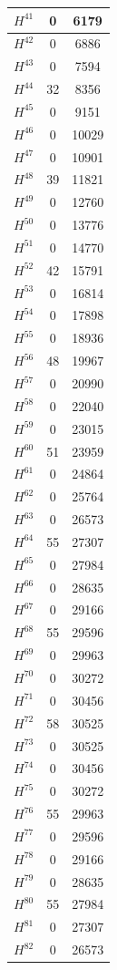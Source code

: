 \begin{tabular}{|c|c|c|}
\hline
$H^{41}$&0&6179\\\hline
$H^{42}$&0&6886\\\hline
$H^{43}$&0&7594\\\hline
$H^{44}$&32&8356\\\hline
$H^{45}$&0&9151\\\hline
$H^{46}$&0&10029\\\hline
$H^{47}$&0&10901\\\hline
$H^{48}$&39&11821\\\hline
$H^{49}$&0&12760\\\hline
$H^{50}$&0&13776\\\hline
$H^{51}$&0&14770\\\hline
$H^{52}$&42&15791\\\hline
$H^{53}$&0&16814\\\hline
$H^{54}$&0&17898\\\hline
$H^{55}$&0&18936\\\hline
$H^{56}$&48&19967\\\hline
$H^{57}$&0&20990\\\hline
$H^{58}$&0&22040\\\hline
$H^{59}$&0&23015\\\hline
$H^{60}$&51&23959\\\hline
$H^{61}$&0&24864\\\hline
$H^{62}$&0&25764\\\hline
$H^{63}$&0&26573\\\hline
$H^{64}$&55&27307\\\hline
$H^{65}$&0&27984\\\hline
$H^{66}$&0&28635\\\hline
$H^{67}$&0&29166\\\hline
$H^{68}$&55&29596\\\hline
$H^{69}$&0&29963\\\hline
$H^{70}$&0&30272\\\hline
$H^{71}$&0&30456\\\hline
$H^{72}$&58&30525\\\hline
$H^{73}$&0&30525\\\hline
$H^{74}$&0&30456\\\hline
$H^{75}$&0&30272\\\hline
$H^{76}$&55&29963\\\hline
$H^{77}$&0&29596\\\hline
$H^{78}$&0&29166\\\hline
$H^{79}$&0&28635\\\hline
$H^{80}$&55&27984\\\hline
$H^{81}$&0&27307\\\hline
$H^{82}$&0&26573\\ \hline
\end{tabular}
